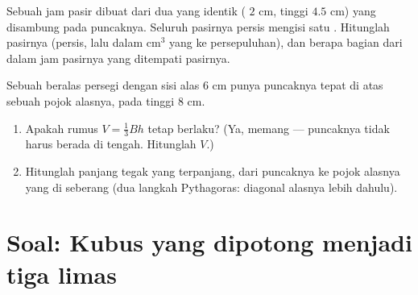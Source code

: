 \begin{exercise}[$\star\star$]\label{exo:g8:solids:10}
Sebuah jam pasir dibuat dari dua  yang identik (
$2$ cm, tinggi $4.5$ cm) yang disambung pada puncaknya. Seluruh
pasirnya persis mengisi satu . Hitunglah  pasirnya
(persis, lalu dalam cm$^3$ yang  ke persepuluhan), dan
berapa bagian dari  dalam jam pasirnya yang ditempati pasirnya.
\end{exercise}

\begin{exercise}[$\star\star\star$]\label{exo:g8:solids:11}
Sebuah  beralas persegi dengan sisi alas $6$ cm punya puncaknya
tepat di atas sebuah pojok alasnya, pada tinggi $8$ cm.
\begin{enumerate}
  \item Apakah rumus $V = \frac13 Bh$ tetap berlaku? (Ya, memang ---
        puncaknya tidak harus berada di tengah. Hitunglah $V$.)
  \item Hitunglah panjang  tegak yang terpanjang, dari puncaknya
        ke pojok alasnya yang di seberang (dua langkah Pythagoras:
        diagonal alasnya lebih dahulu).
\end{enumerate}
\end{exercise}

\section{Soal: Kubus yang dipotong menjadi tiga limas}

